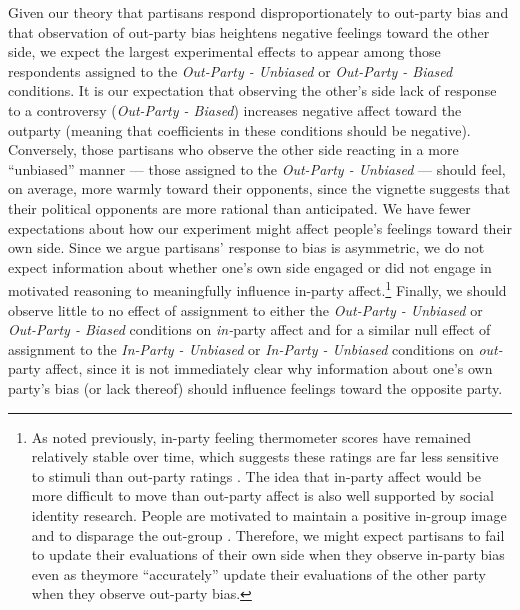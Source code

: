 \documentclass[12pt, letterpaper]{article}
\begin{document}
Given our theory that partisans respond disproportionately to out-party bias and that observation of out-party bias heightens negative feelings toward the other side, we expect the largest experimental effects to appear among those respondents assigned to the \textit{Out-Party - Unbiased} or \textit{Out-Party - Biased} conditions. It is our expectation that observing the other's side lack of response  to a controversy (\textit{Out-Party - Biased}) increases negative affect toward the outparty (meaning that coefficients in these conditions should be negative). Conversely, those partisans who observe the other side reacting in a more ``unbiased'' manner --- those assigned to the \textit{Out-Party - Unbiased} --- should feel, on average, more warmly toward their opponents, since the vignette suggests that their political opponents are more rational than anticipated. We have fewer expectations about how our experiment might affect people's feelings toward their own side. Since we argue partisans' response to bias is asymmetric, we do not expect information about whether one's own side engaged or did not engage in motivated reasoning to meaningfully influence in-party affect.\footnote{As noted previously, in-party feeling thermometer scores have remained relatively stable over time, which suggests these ratings are far less sensitive to stimuli than out-party ratings \citep{haidthetherington_2012, IyengarSoodLelkes2012}. The idea that in-party affect would be more difficult to move than out-party affect is also well supported by social identity research. People are motivated to maintain a positive in-group image and to disparage the out-group \citep{tajfelturner_1979}. Therefore, we might expect partisans to fail to update their evaluations of their own side when they observe in-party bias even as theymore ``accurately'' update their evaluations of the other party when they observe out-party bias.} Finally, we should observe little to no effect of assignment to either the \textit{Out-Party - Unbiased} or \textit{Out-Party - Biased} conditions on \textit{in-}party affect and for a similar null effect of assignment to the \textit{In-Party - Unbiased} or \textit{In-Party - Unbiased} conditions on \textit{out-}party affect, since it is not immediately clear why information about one's own party's bias (or lack thereof) should influence feelings toward the opposite party. 
\end{document}
